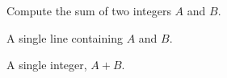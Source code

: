 Compute the sum of two integers $A$ and $B$.

A single line containing $A$ and $B$.

A single integer, $A + B$.
